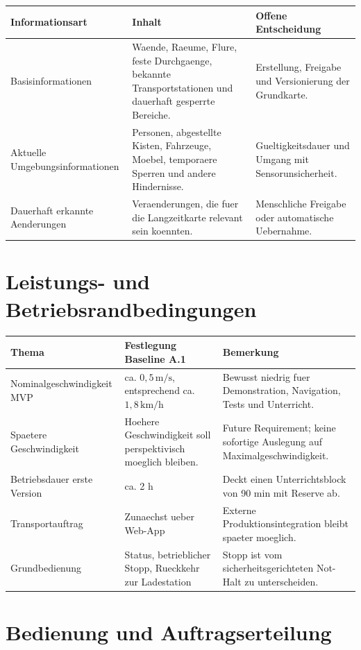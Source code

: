 \begin{longtable}{L{0.24\textwidth} L{0.42\textwidth} L{0.22\textwidth}}
\toprule
Informationsart & Inhalt & Offene Entscheidung \\
\midrule
Basisinformationen & Waende, Raeume, Flure, feste Durchgaenge, bekannte Transportstationen und dauerhaft gesperrte Bereiche. & Erstellung, Freigabe und Versionierung der Grundkarte. \\
Aktuelle Umgebungsinformationen & Personen, abgestellte Kisten, Fahrzeuge, Moebel, temporaere Sperren und andere Hindernisse. & Gueltigkeitsdauer und Umgang mit Sensorunsicherheit. \\
Dauerhaft erkannte Aenderungen & Veraenderungen, die fuer die Langzeitkarte relevant sein koennten. & Menschliche Freigabe oder automatische Uebernahme. \\
\bottomrule
\end{longtable}

\section{Leistungs- und Betriebsrandbedingungen}

\begin{longtable}{L{0.22\textwidth} L{0.38\textwidth} L{0.26\textwidth}}
\toprule
Thema & Festlegung Baseline A.1 & Bemerkung \\
\midrule
Nominalgeschwindigkeit MVP & ca. $0{,}5\,\mathrm{m/s}$, entsprechend ca. $1{,}8\,\mathrm{km/h}$ & Bewusst niedrig fuer Demonstration, Navigation, Tests und Unterricht. \\
Spaetere Geschwindigkeit & Hoehere Geschwindigkeit soll perspektivisch moeglich bleiben. & Future Requirement; keine sofortige Auslegung auf Maximalgeschwindigkeit. \\
Betriebsdauer erste Version & ca. 2 h & Deckt einen Unterrichtsblock von 90 min mit Reserve ab. \\
Transportauftrag & Zunaechst ueber Web-App & Externe Produktionsintegration bleibt spaeter moeglich. \\
Grundbedienung & Status, betrieblicher Stopp, Rueckkehr zur Ladestation & Stopp ist vom sicherheitsgerichteten Not-Halt zu unterscheiden. \\
\bottomrule
\end{longtable}

\section{Bedienung und Auftragserteilung}

